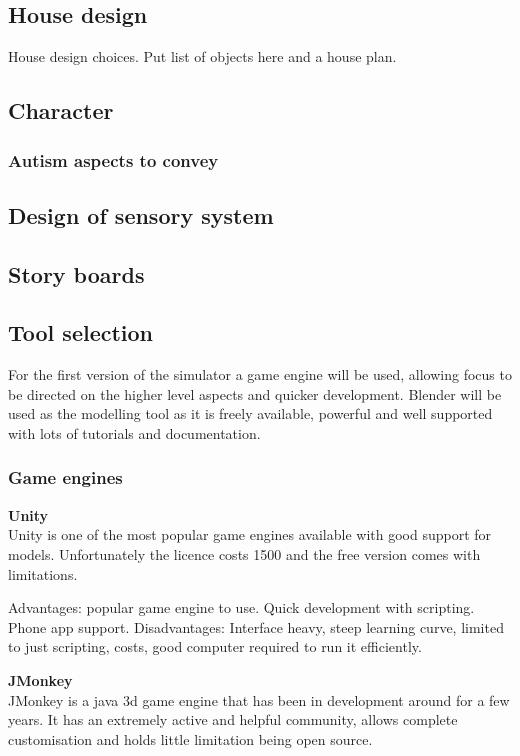 \documentclass[11pt]{report}
\begin{document}
\subsection{House design}
House design choices. 
Put list of objects here and a house plan. 
\subsection{Character}
\subsubsection{Autism aspects to convey}
\subsection{Design of sensory system}
\subsection{Story boards}

\subsection{Tool selection}
For the first version of the simulator a game engine will be used, allowing focus to be directed on the higher level aspects and quicker development. Blender will be used as the modelling tool as it is freely available, powerful and well supported with lots of tutorials and documentation.

\subsubsection{Game engines}

\textbf{Unity}\\
Unity is one of the most popular game engines available with good support for models. Unfortunately the licence costs 1500 and the free version comes with limitations.

Advantages: popular game engine to use. Quick development with scripting. Phone app support.
Disadvantages: Interface heavy, steep learning curve, limited to just scripting, costs, good computer required to run it efficiently.

\textbf{JMonkey}\\
JMonkey is a java 3d game engine that has been in development around for a few years. It has an extremely active and helpful community, allows complete customisation and holds little limitation being open source.
\end{document}
